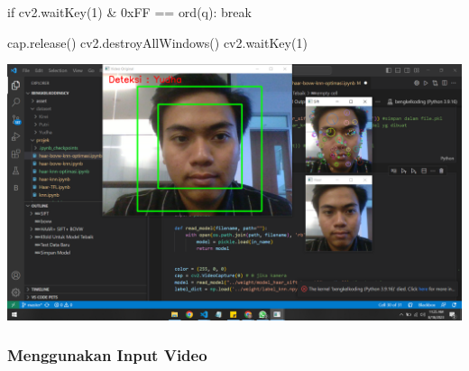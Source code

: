 \documentclass[
  letterpaper,
  DIV=11,
  numbers=noendperiod]{scrreprt}
\newenvironment{Shaded}{\begin{snugshade}}{\end{snugshade}}
\newcommand{\BaseNTok}[1]{\textcolor[rgb]{0.68,0.00,0.00}{#1}}
\newcommand{\BuiltInTok}[1]{\textcolor[rgb]{0.00,0.23,0.31}{#1}}
\newcommand{\ControlFlowTok}[1]{\textcolor[rgb]{0.00,0.23,0.31}{#1}}
\newcommand{\DecValTok}[1]{\textcolor[rgb]{0.68,0.00,0.00}{#1}}
\newcommand{\NormalTok}[1]{\textcolor[rgb]{0.00,0.23,0.31}{#1}}
\newcommand{\OperatorTok}[1]{\textcolor[rgb]{0.37,0.37,0.37}{#1}}
\newcommand{\StringTok}[1]{\textcolor[rgb]{0.13,0.47,0.30}{#1}}
\begin{document}
\begin{Shaded}
\begin{Highlighting}[]
    \ControlFlowTok{if}\NormalTok{ cv2.waitKey(}\DecValTok{1}\NormalTok{) }\OperatorTok{\&} \BaseNTok{0xFF} \OperatorTok{==} \BuiltInTok{ord}\NormalTok{(}\StringTok{\textquotesingle{}q\textquotesingle{}}\NormalTok{):}
        \ControlFlowTok{break}
    
\NormalTok{cap.release()}
\NormalTok{cv2.destroyAllWindows()}
\NormalTok{cv2.waitKey(}\DecValTok{1}\NormalTok{)  }
\end{Highlighting}
\end{Shaded}

\includegraphics{Asset/testhaar_sift_knn.png}

\hypertarget{menggunakan-input-video}{%
\subsubsection*{Menggunakan Input Video}\label{menggunakan-input-video}}
\end{document}
